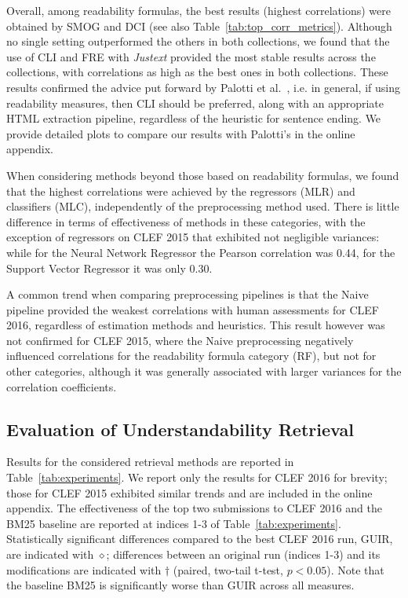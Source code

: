 Overall, among readability formulas, the best results (highest correlations) were obtained by SMOG and DCI (see also Table~\ref{tab:top_corr_metrics}). Although no single setting outperformed the others in both collections, we found that the use of CLI and FRE with \textit{Justext} provided the most stable results across the collections, with correlations as high as the best ones in both collections.
These results confirmed the advice put forward by Palotti et al.~\cite{palotti15}, i.e. in general, if using readability measures, then CLI should be preferred, along with an appropriate HTML extraction pipeline, regardless of the heuristic for sentence ending. We provide detailed plots to compare our results with Palotti's in the online appendix.

When considering methods beyond those based on readability formulas, we found that the highest correlations were achieved by the regressors (MLR) and classifiers (MLC), independently of the preprocessing method used. There is little difference in terms of effectiveness of methods in these categories, with the exception of regressors on CLEF 2015 that exhibited not negligible variances: while for the Neural Network Regressor the Pearson correlation was 0.44, for the Support Vector Regressor it was only 0.30.

A common trend when comparing preprocessing pipelines is that the Naive pipeline provided the weakest correlations with human assessments for CLEF 2016, regardless of estimation methods and heuristics. This result however was not confirmed for CLEF 2015, where the Naive preprocessing negatively influenced correlations for the readability formula category (RF), but not for other categories, although it was generally associated with larger variances for the correlation coefficients.


\subsection*{Evaluation of Understandability Retrieval}
\label{sec:results}




Results for the considered retrieval methods are reported in Table~\ref{tab:experiments}. We report only the results for CLEF 2016 for brevity; those for CLEF 2015 exhibited similar trends and are included in the online appendix. The effectiveness of the top two submissions to CLEF 2016 and the BM25 baseline are reported at indices 1-3 of Table~\ref{tab:experiments}. Statistically significant differences compared to the best CLEF 2016 run, GUIR, are indicated with $\diamond$; differences between an original run (indices 1-3) and its modifications are indicated with $\dagger$ (paired, two-tail t-test, $p<0.05$). Note that the baseline BM25 is significantly worse than GUIR across all measures.

